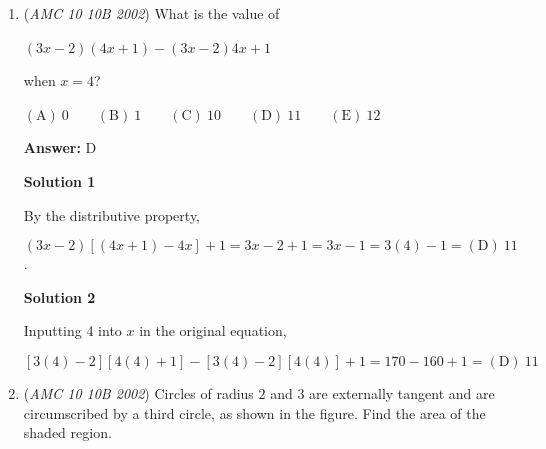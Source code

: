 \begin{enumerate}
 $\mathrm{(A) \ } 0\qquad \mathrm{(B) \ } 2\qquad \mathrm{(C) \ } 4\qquad \mathrm{(D) \ } 6\qquad \mathrm{(E) \ } 8$

 \textbf{Answer: }A



\textbf{Solution 1}

We wish to find $\frac{9+99+\cdots +999999999}{9}$, or $\frac{9(1+11+111+\cdots +111111111)}{9}=123456789$. This doesn't have the digit 0, so the answer is $\boxed{\mathrm{(A)}\ 0}$




\textbf{Solution 2}

Notice that the final number is guaranteed to have the digits $\{1, 3, 5, 7, 9\}$ and that each of these digits can be paired with an even number adding up to 9. $\boxed{\mathrm{(A)}\ 0}$ can be taken out, with the other digits fulfilling divisibility by 9.

 



\textbf{Solution 3}

The arithmetic mean is $\frac{(10^1-1)+(10^2-1)+\ldots+(10^9-1)}{9}=\frac{1111111101}{9}=123456789$. So select $\boxed{\mathrm{A}}$.~hastapasta

 


	\item (\textit{AMC 10 10B 2002}) What is the value of


 $(3x-2)(4x+1)-(3x-2)4x+1$


 



 when $x=4$?


 $\mathrm{(A) \ } 0\qquad \mathrm{(B) \ } 1\qquad \mathrm{(C) \ } 10\qquad \mathrm{(D) \ } 11\qquad \mathrm{(E) \ } 12$

 \textbf{Answer: }D



\textbf{Solution 1}

By the distributive property, 

 
 \[(3x-2)[(4x+1)-4x] + 1 = 3x-2 + 1 = 3x-1 = 3(4) - 1 = \boxed{\mathrm{(D)}\ 11}\].

 



\textbf{Solution 2}

Inputting 4 into $x$ in the original equation,

 
 \[[3(4)-2][4(4)+1]-[3(4)-2][4(4)]+1 = 170-160+1 = \boxed{\mathrm{(D)}\ 11}\]



	\item (\textit{AMC 10 10B 2002}) Circles of radius $2$ and $3$ are externally tangent and are circumscribed by a third circle, as shown in the figure. Find the area of the shaded region.



\end{enumerate}
